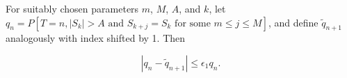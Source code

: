 For suitably chosen parameters $m$, $M$, $A$, and $k$, let $q_n = P[T = n, |S_k| > A \text{ and } S_{k+j} = S_k \text{ for some } m \leq j \leq M]$, and define $\tilde{q}_{n+1}$ analogously with index shifted by 1. Then

$$|q_n - \tilde{q}_{n+1}| \leq \epsilon_1 q_n.$$
